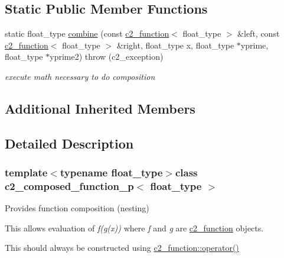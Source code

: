 \subsection*{Static Public Member Functions}
\begin{DoxyCompactItemize}
\item 
\hypertarget{classc2__composed__function__p_a9431a8977df47ca1fde4a4ba92525781}{static float\-\_\-type \hyperlink{classc2__composed__function__p_a9431a8977df47ca1fde4a4ba92525781}{combine} (const \hyperlink{classc2__function}{c2\-\_\-function}$<$ float\-\_\-type $>$ \&left, const \hyperlink{classc2__function}{c2\-\_\-function}$<$ float\-\_\-type $>$ \&right, float\-\_\-type x, float\-\_\-type $\ast$yprime, float\-\_\-type $\ast$yprime2)  throw (c2\-\_\-exception)}\label{classc2__composed__function__p_a9431a8977df47ca1fde4a4ba92525781}

\begin{DoxyCompactList}\small\item\em execute math necessary to do composition \end{DoxyCompactList}\end{DoxyCompactItemize}
\subsection*{Additional Inherited Members}


\subsection{Detailed Description}
\subsubsection*{template$<$typename float\-\_\-type$>$class c2\-\_\-composed\-\_\-function\-\_\-p$<$ float\-\_\-type $>$}

Provides function composition (nesting)

This allows evaluation of {\itshape f(g(x))} where {\itshape f} and {\itshape g} are \hyperlink{classc2__function}{c2\-\_\-function} objects. 

This should always be constructed using \hyperlink{classc2__function_compose_operator}{c2\-\_\-function\-:\-:operator()} 

